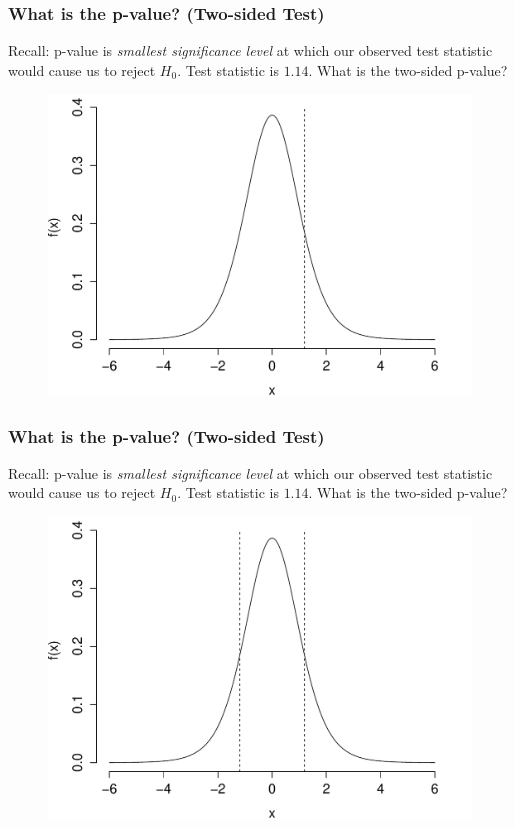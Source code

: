 \documentclass[handout]{beamer}
\begin{document}
\begin{frame}
\frametitle{What is the p-value? (Two-sided Test)}
\footnotesize
Recall: p-value is \emph{smallest significance level} at which our observed test statistic would cause us to reject $H_0$. \alert{Test statistic is $1.14$. What is the two-sided p-value? }
\begin{figure}
\includegraphics[scale= 0.4]{./images/p_both2}

\end{figure}

\end{frame}

\begin{frame}
\frametitle{What is the p-value? (Two-sided Test)}
\footnotesize
Recall: p-value is \emph{smallest significance level} at which our observed test statistic would cause us to reject $H_0$. \alert{Test statistic is $1.14$. What is the two-sided p-value? }
\begin{figure}
\includegraphics[scale= 0.4]{./images/p_both3}

\end{figure}

\end{frame}
\end{document}
